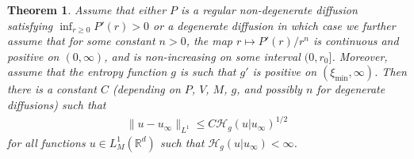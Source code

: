 \documentclass[reqno]{amsart}
\newtheorem{theorem}[lemma]{Theorem}
\newcommand{\R}{\mathbb{R}}
\newcommand{\uinf}{u_\infty}
\begin{document}
\begin{theorem}\label{gencz}
Assume that either $P$ is a regular non-degenerate diffusion satisfying $\inf_{r\ge0} P'(r)>0$ or a degenerate diffusion in which case we further assume that for some constant $n>0$, the map $r\mapsto P'(r)/r^n$ is continuous and positive on $(0,\infty)$, and is non-increasing on some interval $(0,r_0]$. Moreover, assume that the entropy function $g$ is such that $g'$ is positive on $(\xi_{\min},\infty)$.
Then there is a constant $C$ (depending on $P$, $V$, $M$, $g$, and possibly $n$ for degenerate diffusions) such that
    \begin{align}
        \label{eq:ourCK}
        \|u-\uinf\|_{L^1} \le C {\mathcal H}_g(u|\uinf)^{1/2}
    \end{align}
for all functions $u\in L^1_M(\R^d)$ such that ${\mathcal H}_g(u|\uinf)<\infty$.\\
\end{theorem}
%
\end{document}
